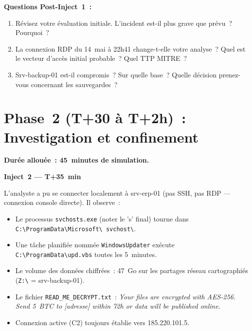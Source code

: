 \begin{boxexo}
\textbf{Questions Post-Inject~1~:}

\begin{enumerate}
  \item Révisez votre évaluation initiale. L'incident est-il plus
        grave que prévu~? Pourquoi~?
  \item La connexion RDP du 14~mai à 22h41 change-t-elle votre
        analyse~? Quel est le vecteur d'accès initial probable~?
        Quel TTP MITRE~?
  \item Srv-backup-01 est-il compromis~? Sur quelle base~?
        Quelle décision prenez-vous concernant les sauvegardes~?
\end{enumerate}
\end{boxexo}


\section{Phase~2 (T+30 à T+2h)~: Investigation et confinement}
\label{lab3:phase2}

\textbf{Durée allouée~: 45~minutes de simulation.}

\begin{boxlizbiz}
\textbf{Inject~2 — T+35~min}

L'analyste a pu se connecter localement à srv-erp-01 (pas SSH, pas RDP —
connexion console directe). Il observe~:
\begin{itemize}
  \item Le processus \texttt{svchosts.exe} (noter le 's' final) tourne
    dans \texttt{C:\textbackslash ProgramData\textbackslash Microsoft\textbackslash
    svchost\textbackslash}.
  \item Une tâche planifiée nommée \texttt{WindowsUpdater} exécute
    \texttt{C:\textbackslash ProgramData\textbackslash upd.vbs} toutes les
    5~minutes.
  \item Le volume des données chiffrées~: 47~Go sur les partages réseau
    cartographiés (\texttt{Z:\textbackslash} = srv-backup-01).
  \item Le fichier \texttt{READ\_ME\_DECRYPT.txt}~:
    \og{}\textit{Your files are encrypted with AES-256. Send 5~BTC to
    [adresse] within 72h or data will be published online.}\fg{}
  \item Connexion active (C2) toujours établie vers 185.220.101.5.
\end{itemize}
\end{boxlizbiz}

